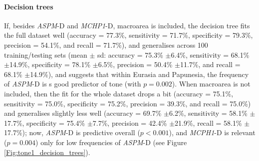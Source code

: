 \documentclass[twoside,onecolumn]{article}
\begin{document}
\paragraph{Decision trees}

If, besides \textit{ASPM}-D and \textit{MCHP1}-D, macroarea is included, the decision tree fits the full dataset well (accuracy = 77.3\%, sensitivity = 71.7\%, specificity = 79.3\%, precision = 54.1\%, and recall = 71.7\%), and generalises across 100 training/testing sets (mean $\pm$ sd: accuracy = 75.3\% $\pm$6.4\%, sensitivity = 68.1\% $\pm$14.9\%, specificity = 78.1\% $\pm$6.5\%, precision = 50.4\% $\pm$11.7\%, and recall = 68.1\% $\pm$14.9\%), and suggests that within Eurasia and Papunesia, the frequency of \textit{ASPM}-D is s good predictor of tone (with $p = 0.002$).
When macroarea is not included, then the fit for the whole dataset drops a bit (accuracy = 75.1\%, sensitivity = 75.0\%, specificity = 75.2\%, precision = 39.3\%, and recall = 75.0\%) and generalises slightly less well (accuracy = 69.7\% $\pm$6.2\%, sensitivity = 58.1\% $\pm$17.7\%, specificity = 75.4\% $\pm$7.7\%, precision = 42.4\% $\pm$21.9\%, recall = 58.1\% $\pm$17.7\%); now, \textit{ASPM}-D is predictive overall ($p < 0.001$), and \textit{MCPH1}-D is relevant ($p = 0.004$) only for low frequencies of \textit{ASPM}-D (see Figure \ref{Fig:tone1_decision_trees}).
\end{document}
